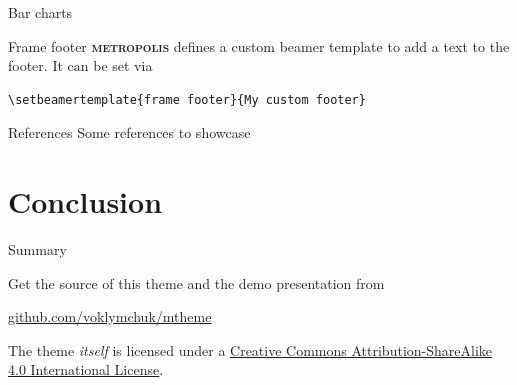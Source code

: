 \documentclass{beamer}
\newcommand{\themename}{\textbf{\textsc{metropolis}}\xspace}
\begin{document}
\begin{frame}{Bar charts}
	\begin{figure}
	\end{figure}
\end{frame}






{%
	\begin{frame}[fragile]{Frame footer}
		\themename defines a custom beamer template to add a text to the footer. It can be set via
		\begin{verbatim}\setbeamertemplate{frame footer}{My custom footer}\end{verbatim}
	\end{frame}
}

\begin{frame}{References}
	Some references to showcase~\cite{knuth92,ConcreteMath,Simpson,Er01,greenwade93}
\end{frame}

\section{Conclusion}

\begin{frame}{Summary}
	
	Get the source of this theme and the demo presentation from
	
	\begin{center}\url{github.com/voklymchuk/mtheme}\end{center}
	
	The theme \emph{itself} is licensed under a
	\href{http://creativecommons.org/licenses/by-sa/4.0/}{Creative Commons
		Attribution-ShareAlike 4.0 International License}.
	
	\begin{center}\ccbysa\end{center}
	
\end{frame}
\end{document}
